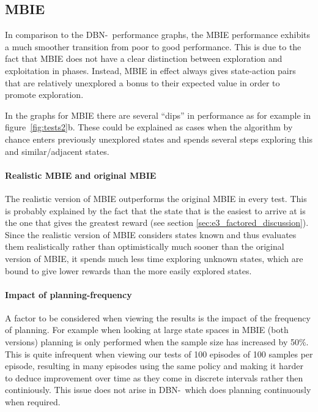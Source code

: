 \subsection{MBIE}
In comparison to the DBN-\etre\ performance graphs, the MBIE performance exhibits a much smoother transition from poor to good performance. This is due to the fact that MBIE does not have a clear distinction between exploration and exploitation in phases. Instead, MBIE in effect always gives state-action pairs that are relatively unexplored a bonus to their expected value in order to promote exploration.  

In the graphs for MBIE there are several ``dips'' in performance as for example in figure~\ref{fig:tests2}b. These could be explained as cases when the algorithm by chance enters previously unexplored states and spends several steps exploring this and similar/adjacent states. 

\paragraph{Realistic MBIE and original MBIE}
The realistic version of MBIE outperforms the original MBIE in every test. This is probably explained by the fact that the state that is the easiest to arrive at is the one that gives the greatest reward (see section \ref{sec:e3_factored_discussion}). Since the realistic version of MBIE considers states known and thus evaluates them  realistically rather than optimistically much sooner than the original version of MBIE, it spends much less time exploring unknown states, which are bound to give lower rewards than the more easily explored states. 

\paragraph{Impact of planning-frequency}
A factor to be considered when viewing the results is the impact of the frequency of planning. For example when looking at large state spaces in MBIE (both versions) planning is only performed when the sample size has increased by 50\%. This is quite infrequent when viewing our tests of 100 episodes of 100 samples per episode, resulting in many episodes using the same policy and making it harder to deduce improvement over time as they come in discrete intervals rather then continiously. This issue does not arise in DBN-\etre\ which does planning continuously when required.    



